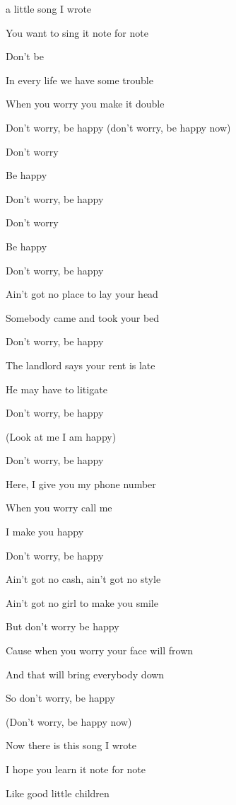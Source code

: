 

\zs
{} a little song I wrote 

You  want to sing it note for note 

Don't  be 

In every life we have some trouble

When you worry you make it double 

Don't worry, be happy (don't worry, be happy now)
\ks

\zr
Don't worry 

Be happy

Don't worry, be happy

Don't worry

Be happy

Don't worry, be happy
\kr

\zs
Ain't got no place to lay your head 

Somebody came and took your bed

Don't worry, be happy 

The landlord says your rent is late 

He may have to litigate 

Don't worry, be happy 

(Look at me I am happy)
\ks

\zr
Don't worry, be happy 

Here, I give you my phone number 

When you worry call me

I make you happy 

Don't worry, be happy 
\kr

\zs
Ain't got no cash, ain't got no style 

Ain't got no girl to make you smile 

But don't worry be happy

Cause when you worry your face will frown 

And that will bring everybody down 

So don't worry, be happy 

(Don't worry, be happy now)
\ks

\zr
\kr

\zs
Now there is this song I wrote 

I hope you learn it note for note 

Like good little children 

